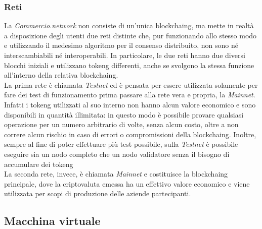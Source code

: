 \subsubsection*{Reti}

La \textit{Commercio.network} non consiste di un'unica \gls{blockchaing}, ma mette in realtà a disposizione degli utenti due reti distinte che, pur funzionando allo stesso modo e utilizzando il medesimo algoritmo per il consenso distribuito, non sono né interscambiabili né interoperabili. In particolare, le due reti hanno due diversi blocchi iniziali e utilizzano \gls{tokeng} differenti, anche se svolgono la stessa funzione all'interno della relativa \gls{blockchaing}.\\
La prima rete è chiamata \textit{Testnet} ed è pensata per essere utilizzata solamente per fare dei test di funzionamento prima passare alla rete vera e propria, la \textit{Mainnet}. Infatti i \gls{tokeng} utilizzati al suo interno non hanno alcun valore economico e sono disponibili in quantità illimitata: in questo modo è possibile provare qualsiasi operazione per un numero arbitrario di volte, senza alcun costo, oltre a non correre alcun rischio in caso di errori o compromissioni della \gls{blockchaing}. Inoltre, sempre al fine di poter effettuare più test possibile, sulla \textit{Testnet} è possibile eseguire sia un nodo completo che un nodo validatore senza il bisogno di accumulare dei \gls{tokeng}\\
La seconda rete, invece, è chiamata \textit{Mainnet} e costituisce la \gls{blockchaing} principale, dove la criptovaluta emessa ha un effettivo valore economico e viene utilizzata per scopi di produzione delle aziende partecipanti.

\subsection{Macchina virtuale}

